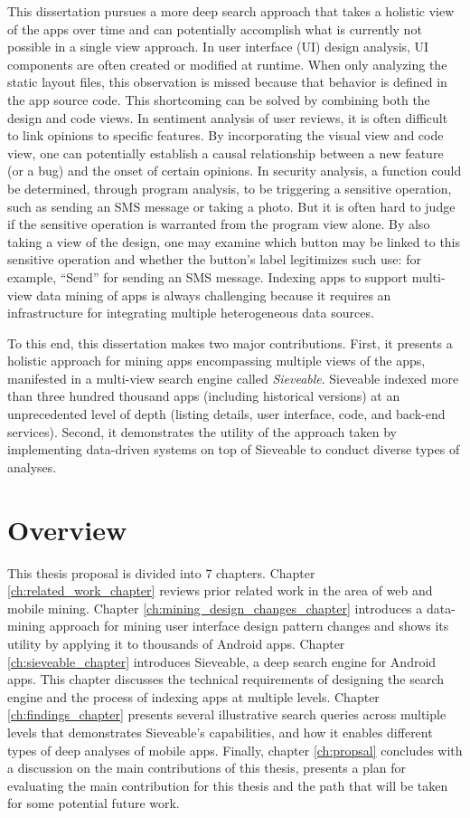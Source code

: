 This dissertation pursues a more deep search approach that takes a holistic view of the apps over time and can potentially accomplish what is currently not possible in a single view approach.
In user interface (UI) design analysis, UI components are often created or modified at runtime.
When only analyzing the static layout files, this observation is missed because that behavior is defined in the app source code.
This shortcoming can be solved by combining both the design and code views.
In sentiment analysis of user reviews, it is often difficult to link opinions to specific features.
By incorporating the visual view and code view, one can potentially establish a causal relationship between a new feature (or a bug) and the onset of certain opinions.
In security analysis, a function could be determined, through program analysis, to be triggering a sensitive operation, such as sending an SMS message or taking a photo.
But it is often hard to judge if the sensitive operation is warranted from the program view alone.
By also taking a view of the design, one may examine which button may be linked to this sensitive operation and whether the button's label legitimizes such use: for example, ``Send'' for sending an SMS message.
Indexing apps to support multi-view data mining of apps is always challenging because it requires an infrastructure for integrating multiple heterogeneous data sources.

To this end, this dissertation makes two major contributions.
First, it presents a holistic approach for mining apps encompassing multiple views of the apps, manifested in a multi-view search engine called \textit{Sieveable}.
Sieveable indexed more than three hundred thousand apps (including historical versions) at an unprecedented level of depth (listing details, user interface, code, and back-end services).
Second, it demonstrates the utility of the approach taken by implementing data-driven systems on top of Sieveable to conduct diverse types of analyses.

\section{Overview}
This thesis proposal is divided into 7 chapters.
Chapter \ref{ch:related_work_chapter} reviews prior related work in the area of web and mobile mining.
Chapter \ref{ch:mining_design_changes_chapter} introduces a data-mining approach for mining user interface design pattern changes and shows its utility by applying it to thousands of Android apps.
Chapter \ref{ch:sieveable_chapter} introduces Sieveable, a deep search engine for Android apps. 
This chapter discusses the technical requirements of designing the search engine and the process of indexing apps at multiple levels.
Chapter \ref{ch:findings_chapter} presents several illustrative search queries across multiple levels that demonstrates Sieveable's capabilities, and how it enables different types of deep analyses of mobile apps.
Finally, chapter \ref{ch:propsal} concludes with a discussion on the main contributions of this thesis, presents a plan for evaluating the main contribution for this thesis and the path that will be taken for some potential future work.